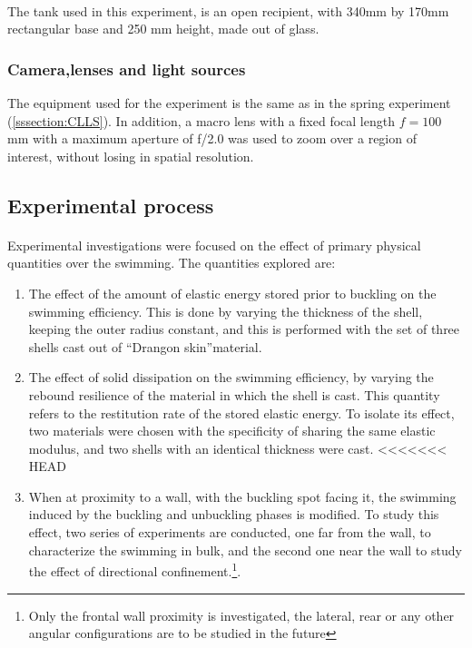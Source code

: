 \paragraph{}
The tank used in this experiment, is an open recipient, with 340mm by 170mm rectangular base and 250 mm height, made out of glass.  
\subsubsection{Camera,lenses and light sources}
The equipment used for the experiment is the same as in the spring experiment (\ref{sssection:CLLS}). In addition, a macro lens with a fixed focal length $f= 100$ mm with a maximum aperture of f/2.0 was used to zoom over a region of interest, without losing in spatial resolution.
  
\subsection{Experimental process}
\paragraph{}
Experimental investigations were focused on the effect of primary physical quantities over the swimming. The quantities explored are:
\begin{enumerate}
	\item The effect of the amount of elastic energy stored prior to buckling on the swimming efficiency. This is done by varying the thickness of the shell, keeping the outer radius constant, and this is performed with the set of three shells cast out of "`Drangon skin"'\textregistered material.
	\item The effect of solid dissipation on the swimming efficiency, by varying the rebound resilience of the material in which the shell is cast. This quantity refers to the restitution rate of the stored elastic energy. To isolate its effect, two materials were chosen with the specificity of sharing the same elastic modulus, and two shells with an identical thickness were cast.
<<<<<<< HEAD
	\item When at proximity to a wall, with the buckling spot facing it, the swimming induced by the buckling and unbuckling phases is modified. To study this effect, two series of experiments are conducted, one far from the wall, to characterize the swimming in bulk, and the second one near the wall to study the effect of directional confinement.\footnote{Only the frontal wall proximity is investigated, the lateral, rear or any other angular configurations are to be studied in the future}. 
\end{enumerate}
